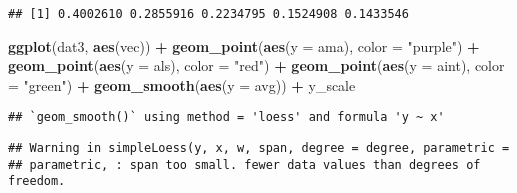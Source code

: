 \documentclass[]{article}
\newenvironment{Shaded}{\begin{snugshade}}{\end{snugshade}}
\newcommand{\CommentTok}[1]{\textcolor[rgb]{0.56,0.35,0.01}{\textit{#1}}}
\newcommand{\ControlFlowTok}[1]{\textcolor[rgb]{0.13,0.29,0.53}{\textbf{#1}}}
\newcommand{\DataTypeTok}[1]{\textcolor[rgb]{0.13,0.29,0.53}{#1}}
\newcommand{\DecValTok}[1]{\textcolor[rgb]{0.00,0.00,0.81}{#1}}
\newcommand{\KeywordTok}[1]{\textcolor[rgb]{0.13,0.29,0.53}{\textbf{#1}}}
\newcommand{\NormalTok}[1]{#1}
\newcommand{\OperatorTok}[1]{\textcolor[rgb]{0.81,0.36,0.00}{\textbf{#1}}}
\newcommand{\StringTok}[1]{\textcolor[rgb]{0.31,0.60,0.02}{#1}}
\begin{document}
\begin{Shaded}
\end{Shaded}

\begin{verbatim}
## [1] 0.4002610 0.2855916 0.2234795 0.1524908 0.1433546
\end{verbatim}

\begin{Shaded}
\begin{Highlighting}[]
\KeywordTok{ggplot}\NormalTok{(dat3, }\KeywordTok{aes}\NormalTok{(vec)) }\OperatorTok{+}\StringTok{ }
\StringTok{  }\KeywordTok{geom_point}\NormalTok{(}\KeywordTok{aes}\NormalTok{(}\DataTypeTok{y =}\NormalTok{ ama), }\DataTypeTok{color =} \StringTok{"purple"}\NormalTok{) }\OperatorTok{+}\StringTok{ }
\StringTok{  }\KeywordTok{geom_point}\NormalTok{(}\KeywordTok{aes}\NormalTok{(}\DataTypeTok{y =}\NormalTok{ als), }\DataTypeTok{color =} \StringTok{"red"}\NormalTok{) }\OperatorTok{+}
\StringTok{  }\KeywordTok{geom_point}\NormalTok{(}\KeywordTok{aes}\NormalTok{(}\DataTypeTok{y =}\NormalTok{ aint), }\DataTypeTok{color =} \StringTok{"green"}\NormalTok{) }\OperatorTok{+}
\StringTok{  }\KeywordTok{geom_smooth}\NormalTok{(}\KeywordTok{aes}\NormalTok{(}\DataTypeTok{y =}\NormalTok{ avg)) }\OperatorTok{+}
\StringTok{  }\NormalTok{y_scale}
\end{Highlighting}
\end{Shaded}

\begin{verbatim}
## `geom_smooth()` using method = 'loess' and formula 'y ~ x'
\end{verbatim}

\begin{verbatim}
## Warning in simpleLoess(y, x, w, span, degree = degree, parametric =
## parametric, : span too small. fewer data values than degrees of freedom.
\end{verbatim}
\end{document}
